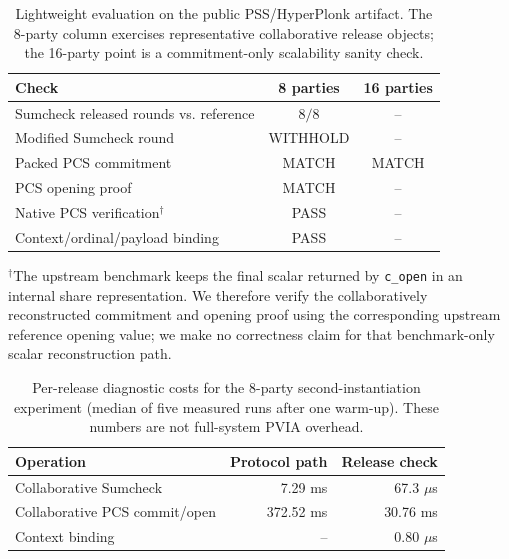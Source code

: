 \begin{table}[t]
\centering
\small
\setlength{\tabcolsep}{4pt}
\caption{Lightweight evaluation on the public PSS/HyperPlonk artifact. The 8-party column exercises representative collaborative release objects; the 16-party point is a commitment-only scalability sanity check.}
\label{tab:second-inst-light}
\begin{tabular}{lcc}
\toprule
Check & 8 parties & 16 parties \\
\midrule
Sumcheck released rounds vs. reference & $8/8$ & -- \\
Modified Sumcheck round & WITHHOLD & -- \\
Packed PCS commitment & MATCH & MATCH \\
PCS opening proof & MATCH & -- \\
Native PCS verification$^\dagger$ & PASS & -- \\
Context/ordinal/payload binding & PASS & -- \\
\bottomrule
\end{tabular}
\vspace{1mm}
\begin{minipage}{0.96\columnwidth}
\footnotesize
$^\dagger$The upstream benchmark keeps the final scalar returned by \texttt{c\_open} in an internal share representation. We therefore verify the collaboratively reconstructed commitment and opening proof using the corresponding upstream reference opening value; we make no correctness claim for that benchmark-only scalar reconstruction path.
\end{minipage}
\end{table}

\begin{table}[t]
\centering
\small
\caption{Per-release diagnostic costs for the 8-party second-instantiation experiment (median of five measured runs after one warm-up). These numbers are not full-system PVIA overhead.}
\label{tab:second-inst-cost}
\begin{tabular}{lrr}
\toprule
Operation & Protocol path & Release check \\
\midrule
Collaborative Sumcheck & 7.29 ms & 67.3 $\mu$s \\
Collaborative PCS commit/open & 372.52 ms & 30.76 ms \\
Context binding & -- & 0.80 $\mu$s \\
\bottomrule
\end{tabular}
\end{table}
